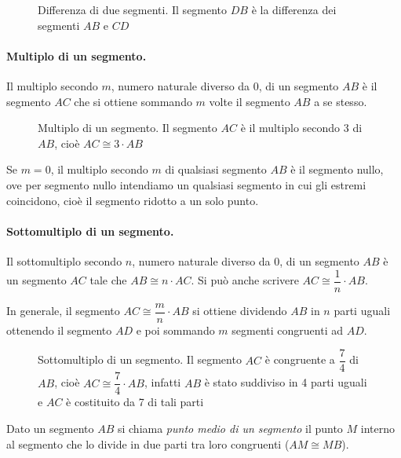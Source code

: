 \begin{figure}[htb]
\centering
\caption{Differenza di due segmenti. Il segmento $DB$ è la differenza dei segmenti $AB$ e $CD$}
\end{figure}

\paragraph{Multiplo di un segmento.} Il multiplo secondo $m$, numero naturale diverso da 0, di un segmento $AB$ è il segmento $AC$ che si ottiene sommando $m$ volte il segmento $AB$ a se stesso.

\begin{figure}[htb]
\centering
\caption{Multiplo di un segmento. Il segmento $AC$ è il multiplo secondo 3 di $AB$, cioè $AC\cong 3\cdot AB$}
\end{figure}

Se $m=0$, il multiplo secondo $m$ di qualsiasi segmento $AB$ è il segmento nullo, ove per segmento nullo intendiamo un qualsiasi segmento in cui gli estremi coincidono, cioè il segmento ridotto a un solo punto.

\paragraph{Sottomultiplo di un segmento.} Il sottomultiplo secondo $n$, numero naturale diverso da 0, di un segmento $AB$ è un segmento $AC$ tale che $AB\cong n\cdot AC$. Si può anche scrivere $AC \cong \dfrac{1}{n}\cdot AB$.

In generale, il segmento $AC\cong\dfrac{m}{n}\cdot AB$ si ottiene dividendo $AB$ in $n$ parti uguali ottenendo il segmento $AD$ e poi sommando $m$ segmenti congruenti ad $AD$.

\begin{figure}[htb]
\centering
\caption{Sottomultiplo di un segmento. Il segmento $AC$ è congruente a $\dfrac{7}{4}$ di $AB$, cioè $AC\cong\dfrac{7}{4}\cdot AB$, infatti $AB$ è stato suddiviso in 4 parti uguali e $AC$ è costituito da 7 di tali parti}
\end{figure}

\begin{definizione}
Dato un segmento $AB$ si chiama \emph{punto medio di un segmento} il punto $M$ interno al segmento che lo divide in due parti tra loro congruenti ($AM\cong MB$).
\end{definizione}

